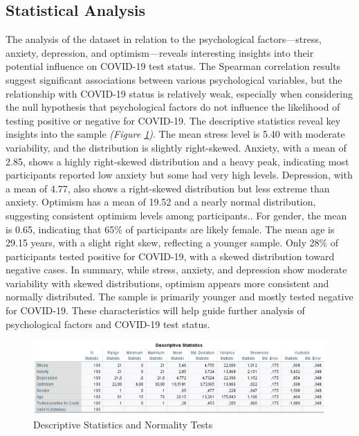 \documentclass[a4paper]{article}
\begin{document}
\subsection{Statistical Analysis}
\vspace{0.5em}
The analysis of the dataset in relation to the psychological factors—stress, anxiety, depression, and optimism—reveals interesting insights into their potential influence on COVID-19 test status.
The Spearman correlation results suggest significant associations between various psychological variables, but the relationship with COVID-19 status is relatively weak,
especially when considering the null hypothesis that psychological factors do not influence the likelihood of testing positive or negative for COVID-19.
\vspace{0.5em}\newline
The descriptive statistics reveal key insights into the sample \textit{(Figure \ref{fig:descriptiveSts})}. The mean stress level is 5.40 with moderate variability, and the distribution is slightly right-skewed.\newline
Anxiety, with a mean of 2.85, shows a highly right-skewed distribution and a heavy peak, indicating most participants reported low anxiety but some had very high levels.\newline
Depression, with a mean of 4.77, also shows a right-skewed distribution but less extreme than anxiety.\newline
Optimism has a mean of 19.52 and a nearly normal distribution, suggesting consistent optimism levels among participants..\newline
For gender, the mean is 0.65, indicating that 65\% of participants are likely female. The mean age is 29.15 years, with a slight right skew, reflecting a younger sample.
Only 28\% of participants tested positive for COVID-19, with a skewed distribution toward negative cases.\newline
In summary, while stress, anxiety, and depression show moderate variability with skewed distributions, optimism appears more consistent and normally distributed. 
The sample is primarily younger and mostly tested negative for COVID-19. These characteristics will help guide further analysis of psychological factors and COVID-19 test status.

\vspace{1.5em}

\begin{figure}[ht]
  \centering
  \caption{Descriptive Statistics and Normality Tests}
  \label{fig:descriptiveSts}
  \includegraphics[width=\textwidth]{img/descriptive_statistics.png}  %
\end{figure}
\end{document}
